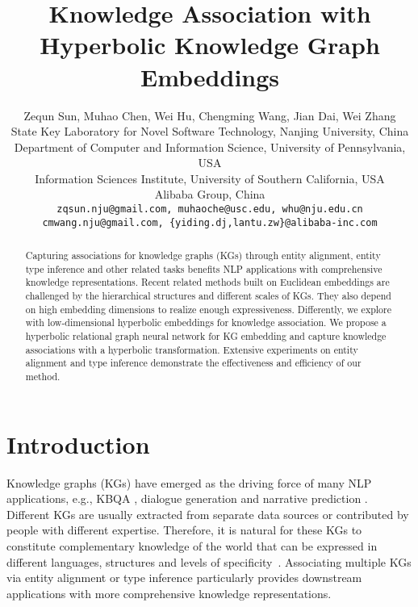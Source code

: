 \documentclass[11pt,a4paper]{article}
\title{Knowledge Association with Hyperbolic Knowledge Graph Embeddings}
\author{Zequn Sun, 
 		Muhao Chen, 
 		Wei Hu, 
 		Chengming Wang, 
 		Jian Dai, 
 		Wei Zhang\\
  State Key Laboratory for Novel Software Technology, Nanjing University, China \\
  Department of Computer and Information Science, University of Pennsylvania, USA \\
  Information Sciences Institute, University of Southern California, USA \\
  Alibaba Group, China \\
  \normalsize\texttt{zqsun.nju@gmail.com,\,muhaoche@usc.edu,\,whu@nju.edu.cn} \\
  \normalsize\texttt{cmwang.nju@gmail.com,\,\{yiding.dj,lantu.zw\}@alibaba-inc.com}}
\date{}
\begin{document}
\maketitle

\begin{abstract}
Capturing associations for knowledge graphs (KGs) through entity alignment, entity type inference and other related tasks benefits NLP applications with comprehensive knowledge representations. Recent related methods built on Euclidean embeddings are challenged by the hierarchical structures and different scales of KGs. They also depend on high embedding dimensions to realize enough expressiveness. Differently, we explore with low-dimensional hyperbolic embeddings for knowledge association. We propose a hyperbolic relational graph neural network for KG embedding and capture knowledge associations with a hyperbolic transformation. Extensive experiments on entity alignment and type inference demonstrate the effectiveness and efficiency of our method.
\end{abstract}

\section{Introduction}
Knowledge graphs (KGs) have emerged as the driving force of many NLP applications, e.g., KBQA \cite{HixonCH15}, dialogue generation \cite{OpenDialKG} and narrative prediction \cite{chen2019incorporating}. Different KGs are usually extracted from separate data sources or contributed by people with different expertise. Therefore, it is natural for these KGs to constitute complementary knowledge of the world that can be expressed in different languages, structures and levels of specificity~\cite{lehmann2015dbpedia,speer2017conceptnet}. Associating multiple KGs via entity alignment \cite{MTransE} or type inference \cite{JOIE} particularly provides downstream applications with more comprehensive knowledge representations. 
\end{document}
